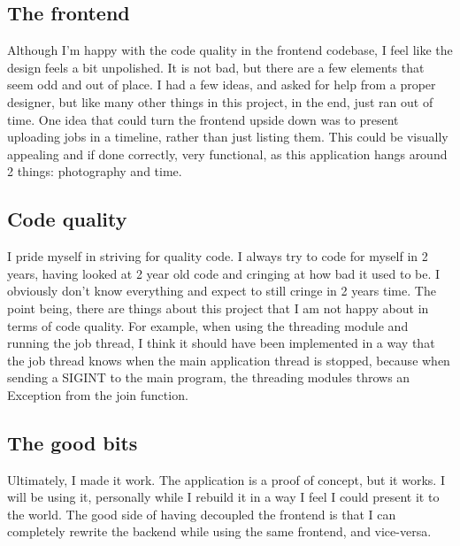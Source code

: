 \documentclass[10pt, a4paper]{article}
\begin{document}
        \subsection{The frontend}
        Although I'm happy with the code quality in the frontend codebase, I feel like the design feels a bit unpolished. It is not bad, but there are a few elements that seem odd and out of place. I had a few ideas, and asked for help from a proper designer, but like many other things in this project, in the end, just ran out of time. One idea that could turn the frontend upside down was to present uploading jobs in a timeline, rather than just listing them. This could be visually appealing and if done correctly, very functional, as this application hangs around 2 things: photography and time.

        \subsection{Code quality}
        I pride myself in striving for quality code. I always try to code for myself in 2 years, having looked at 2 year old code and cringing at how bad it used to be. I obviously don't know everything and expect to still cringe in 2 years time. The point being, there are things about this project that I am not happy about in terms of code quality. For example, when using the threading module and running the job thread, I think it should have been implemented in a way that the job thread knows when the main application thread is stopped, because when sending a SIGINT to the main program, the threading modules throws an Exception from the join function.

        \subsection{The good bits}
        Ultimately, I made it work. The application is a proof of concept, but it works. I will be using it, personally while I rebuild it in a way I feel I could present it to the world.
        The good side of having decoupled the frontend is that I can completely rewrite the backend while using the same frontend, and vice-versa.
\end{document}
